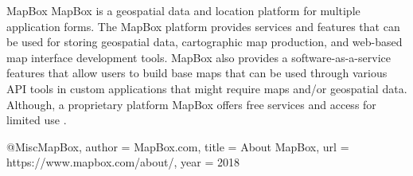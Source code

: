 MapBox
MapBox is a geospatial data and location platform for multiple application forms.  The MapBox platform provides services and features that can be used for storing geospatial data,  cartographic map production, and web-based map interface development tools.  MapBox also provides a software-as-a-service features that allow users to build base maps that can be used through various API tools in custom applications that might require maps and/or geospatial data.  Although, a proprietary platform MapBox offers free services and access for limited use \cite{MapBox}.

@Misc{MapBox,
  author = {MapBox.com},
  title = {About MapBox},
  url = {https://www.mapbox.com/about/},
  year = {2018}
}

